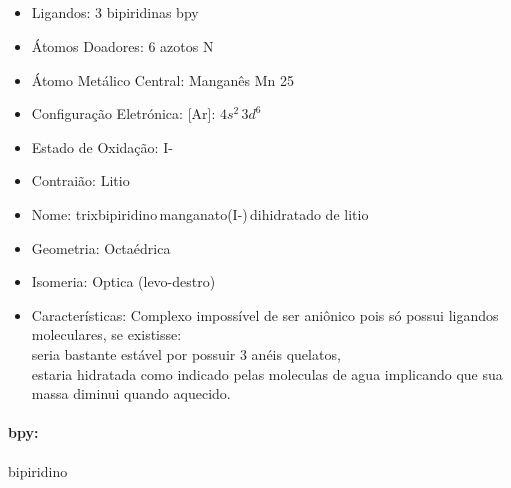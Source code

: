 \documentclass[12pt]{article}
\begin{document}
	\subsection{}
	\begin{itemize}
   
	
   \item Ligandos: 3 bipiridinas bpy
	
   
   \item Átomos Doadores: 6 azotos N
   
   \item Átomo Metálico Central: Manganês Mn 25
   
   \item Configuração Eletrónica: [Ar]: $ 4s^2\,3d^6 $
   
   \item Estado de Oxidação: I-
   
   \item Contraião: Litio
   
   \item Nome: trixbipiridino\,manganato(I-)\,dihidratado de litio
	
   \item Geometria: Octaédrica
   
   \item Isomeria: Optica (levo-destro)

	\item Características:
		Complexo impossível de ser aniônico pois só possui 			ligandos moleculares, se existisse:\\
		seria bastante estável por possuir 3 anéis quelatos,\\
		estaria hidratada como indicado pelas moleculas de agua implicando que sua massa diminui quando aquecido.
			
	\end{itemize}
	
\paragraph{bpy:} bipiridino 

\break


	
	\subsection{}
\end{document}
